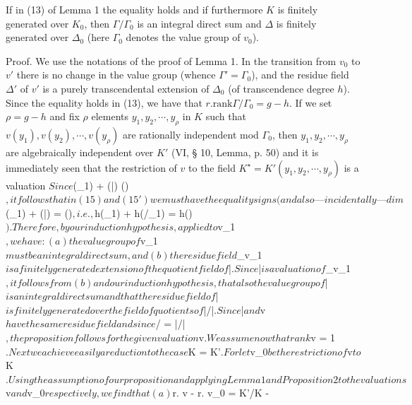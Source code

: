 If in (13) of Lemma 1 the equality holds and if furthermore $K$ is finitely generated over $K_0$, then $\Gamma/\Gamma_0$ is an integral direct sum and $\Delta$ is finitely generated over $\Delta_0$ (here $\Gamma_0$ denotes the value group of $v_0$).

Proof. We use the notations of the proof of Lemma 1. In the transition from $v_0$ to $v'$ there is no change in the value group (whence $\Gamma' = \Gamma_0$), and the residue field $\Delta'$ of $v'$ is a purely transcendental extension of $\Delta_0$ (of transcendence degree $h$). Since the equality holds in (13), we have that $r.\text{rank}\Gamma/\Gamma_0 = g - h$. If we set $\rho = g - h$ and fix $\rho$ elements $y_1, y_2, \cdots, y_\rho$ in $K$ such that $v(y_1), v(y_2), \cdots, v(y_\rho)$ are rationally independent mod $\Gamma_0$, then $y_1, y_2, \cdots, y_\rho$ are algebraically independent over $K'$ (VI, § 10, Lemma, p. 50) and it is immediately seen that the restriction of $v$ to the field $K^\star = K'(y_1, y_2, \cdots, y_\rho)$ is a valuation $

Since $\dim (_1) + \dim (\bar{}) \leq \dim ()$, it follows that in (15) and (15') we must have the equality signs (and also—incidentally—dim $(_1) + \dim (\bar{}) = \dim ()$, i.e., $h(_1) + h(/_1) = h()$). Therefore, by our induction hypothesis, applied to $v_1$, we have: (a) the value group of $v_1$ must be an integral direct sum, and (b) the residue field $\Delta_{v_1}$ is a finitely generated extension of the quotient field of $\bar{}$. Since $\bar{}$ is a valuation of $\Delta_{v_1}$, it follows from (b) and our induction hypothesis, that also the value group of $\bar{}$ is an integral direct sum and that the residue field of $\bar{}$ is finitely generated over the field of quotients of $\bar{}/\bar{}$. Since $\bar{}$ and $v$ have the same residue field and since $/ = \bar{}/\bar{}$, the proposition follows for the given valuation $v$.

We assume now that rank $v = 1$. Next we achieve easily a reduction to the case $K = K'$. For let $v_0$ be the restriction of $v$ to $K$. Using the assumption of our proposition and applying Lemma 1 and Proposition 2 to the valuations $v$ and $v_0$ respectively, we find that (a) $r. v - r. v_0 =  K'/K -  \Delta

